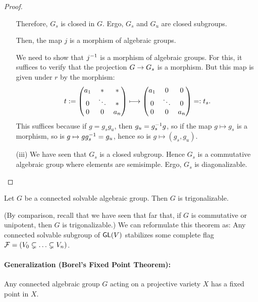 \begin{proof}
\begin{enumerate}
Therefore, $G_s$ is closed in $G$. Ergo, $G_s$ and $G_u$ are closed subgroups.

Then, the map $j$ is a morphism of algebraic groups.

We need to show that $j^{-1}$ is a morphism of algebraic groups. For this, it suffices to verify that the projection $G \overset{}{\rightarrow} G_s$ is a morphism. But this map is given under $r$ by the morphism:
\begin{align*}
t:={\left(\begin{matrix} a_1 & *& *\\
		0 & \ddots & *\\
		0 & 0 & a_n \end{matrix}\right)} \longmapsto{\left(\begin{matrix} a_1 & 0& 0\\
		0 & \ddots & 0\\
		0 & 0 & a_n \end{matrix}\right)} =: t_s.
\end{align*}
This suffices because if $g = g_s g_u$, then $g_u = g_s^{-1} g$, so if the map $g \mapsto g_s$ is a morphism, so is $g\mapsto gg_s^{-1} = g_u$, hence so is $g \mapsto (g_s, g_u)$.
\item[(iii)] We have seen that $G_s$ is a closed subgroup. Hence $G_s$ is a commutative algebraic group where elements are semisimple. Ergo, $G_s$ is diagonalizable.
\end{enumerate}
\end{proof}

\begin{theorem}
Let $G$ be a connected solvable algebraic group. Then $G$ is trigonalizable.
\end{theorem}
(By comparison, recall that we have seen that far that, if $G$ is commutative or unipotent, then $G$ is trigonalizable.)
We can reformulate this theorem as: Any connected solvable subgroup of $\textsf{GL}(V)$ stabilizes some complete flag $\mathcal{F} = (V_0 \subsetneq \ldots \subsetneq  V_n)$.
\paragraph{Generalization (Borel's Fixed Point Theorem):} Any connected algebraic group $G$ acting on a projective variety $X$ has a fixed point in $X$.

